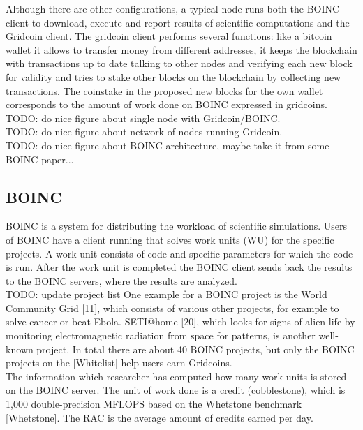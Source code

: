 Although there are other configurations, a typical node runs both the BOINC client to download, execute and report results of scientific computations and the Gridcoin client. The gridcoin client performs several functions: like a bitcoin wallet it allows to transfer money from different addresses, it keeps the blockchain with transactions up to date talking to other nodes and verifying each new block for validity and tries to stake other blocks on the blockchain by collecting new transactions. The coinstake in the proposed new blocks for the own wallet corresponds to the amount of work done on BOINC expressed in gridcoins.\\

TODO: do nice figure about single node with Gridcoin/BOINC.\\
TODO: do nice figure about network of nodes running Gridcoin.\\
TODO: do nice figure about BOINC architecture, maybe take it from some BOINC paper...

\subsection{BOINC}

BOINC is a system for distributing the workload of scientific simulations. Users of BOINC have a client running that solves work units (WU) for the specific projects. A work unit consists of code and specific parameters for which the code is run.  After the work unit is completed the BOINC client sends back the results to the BOINC servers, where the results are analyzed.\\

TODO: update project list
One example for a BOINC project is the World Community Grid [11], which consists of various other projects, for example to solve cancer or beat Ebola. SETI@home [20], which looks for signs of alien life by monitoring electromagnetic radiation from space for patterns, is another well-known project.  In total there are about 40 BOINC projects, but only the BOINC projects on the [Whitelist] help users earn Gridcoins.\\

The information which researcher has computed how many work units is stored on the BOINC server. The unit of work done is a credit (cobblestone), which is 1,000 double-precision MFLOPS based on the Whetstone benchmark [Whetstone].  The RAC is the average amount of credits earned  per day.\\

